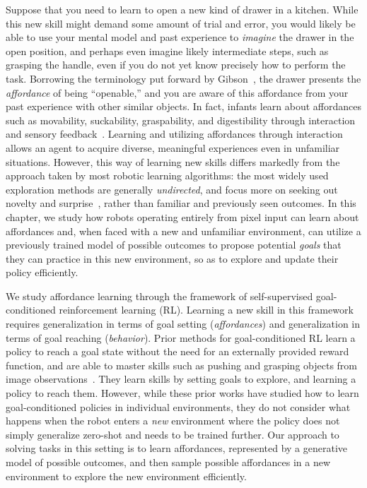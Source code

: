 Suppose that you need to learn to open a new kind of drawer in a kitchen. While this new skill might demand some amount of trial and error, you would likely be able to use your mental model and past experience to \emph{imagine} the drawer in the open position, and perhaps even imagine likely intermediate steps, such as grasping the handle, even if you do not yet know precisely how to perform the task. Borrowing the terminology put forward by Gibson~\citep{gibson1979ecologicalapproach}, the drawer presents the \emph{affordance} of being ``openable,'' and you are aware of this affordance from your past experience with other similar objects. 
In fact, infants learn about affordances such as movability, suckability, graspability, and digestibility through interaction and sensory feedback~\citep{berger2014development}.
Learning and utilizing affordances through interaction allows an agent to acquire diverse, meaningful experiences even in unfamiliar situations.
However, this way of learning new skills differs markedly from the approach taken by most robotic learning algorithms: the most widely used exploration methods are generally \emph{undirected}, and focus more on seeking out novelty and surprise~\citep{houthooft2016vime, tang2017hashtag, pathak2017curiosity}, rather than familiar and previously seen outcomes.
In this chapter, we study how robots operating entirely from pixel input can learn about affordances and, when faced with a new and unfamiliar environment, can utilize a previously trained model of possible outcomes to propose potential \emph{goals} that they can practice in this new environment, so as to explore and update their policy efficiently.



We study affordance learning through the framework of self-supervised goal-conditioned reinforcement learning (RL).
Learning a new skill in this framework requires generalization in terms of goal setting (\emph{affordances}) and generalization in terms of goal reaching (\emph{behavior}).
Prior methods for goal-conditioned RL learn a policy to reach a goal state without the need for an externally provided reward function, and are able to master skills such as pushing and grasping objects from image observations~\citep{agrawal2016poking, nair2018rig, lynch2019play, nair2019ccrig}.
They learn skills by setting goals to explore, and learning a policy to reach them.
However, while these prior works have studied how to learn goal-conditioned policies in individual environments, they do not consider what happens when the robot enters a \emph{new} environment where the policy does not simply generalize zero-shot and needs to be trained further. 
Our approach to solving tasks in this setting is to learn affordances, represented by a generative model of possible outcomes, and then sample possible affordances in a new environment to explore the new environment efficiently.

